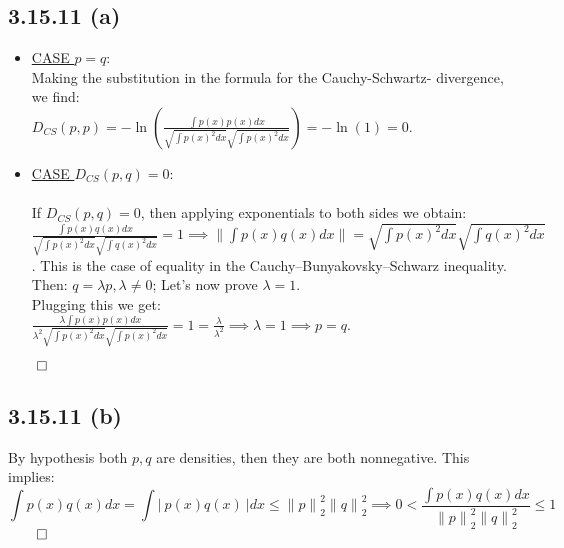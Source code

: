\documentclass{exam}
\renewenvironment{proof}{{\noindent\itshape\ignorespaces}}{{\hfill$\qed$\\}}
\begin{document}
\subsection*{3.15.11 (a)}
\begin{proof}  
    \begin{itemize}
        \item \underline{CASE $p=q$}:\newline
        \\
        Making the substitution in the formula for the Cauchy-Schwartz- divergence, we find:\\
        $D_{CS}(p,p) = -\ln(\displaystyle\frac{\int p(x) p(x) d x}{\sqrt{\int p(x)^2 d x } \sqrt{\int p(x)^2 d x }}) = - \ln(1) = 0.$
        \item \underline{CASE $D_{CS}(p,q) = 0$}:\\
        \\
        If $D_{CS}(p,q) = 0$, then applying exponentials to both sides we obtain:\newline
        $\displaystyle\frac{\displaystyle \int p(x) q(x) d x}{\sqrt{\displaystyle\int p(x)^2 d x } \sqrt{\displaystyle\int q(x)^2 d x }} = 1 \implies \lVert \displaystyle\int p(x) q(x) d x \lVert = \sqrt{\displaystyle \int p(x)^2 d x } \sqrt{\displaystyle \int q(x)^2 d x }$. This is the case of equality in
        the Cauchy–Bunyakovsky–Schwarz inequality. Then: $q = \lambda p, \lambda \neq 0$; Let's now prove $\lambda = 1$.
        \\
        Plugging this we get: \\
        $\displaystyle\frac{\displaystyle \lambda \int p(x) p(x) d x}{\lambda^{2} \sqrt{\displaystyle\int p(x)^2 d x } \sqrt{\displaystyle\int p(x)^2 d x }} = 1 = \frac{\lambda}{\lambda^{2}} \implies \lambda  = 1 \implies p = q.$
    \end{itemize}  
\end{proof}

\subsection*{3.15.11 (b)}
By hypothesis both $p, q$ are densities, then they are both nonnegative. This implies: \\

\begin{proof}  
    \begin{equation*}            
        \displaystyle \int p(x) q(x) d x  = \displaystyle \int \left| \ p(x) q(x) \ \right| d x \leq  {\lVert p \lVert}^{2}_{2} {\lVert q \lVert}^{2}_{2} \implies 0 < \displaystyle\frac{\displaystyle \int p(x) q(x) d x}{{\lVert p \lVert}^{2}_{2} {\lVert q \lVert}^{2}_{2}} \leq 1
    \end{equation*}
\end{proof}
\end{document}
